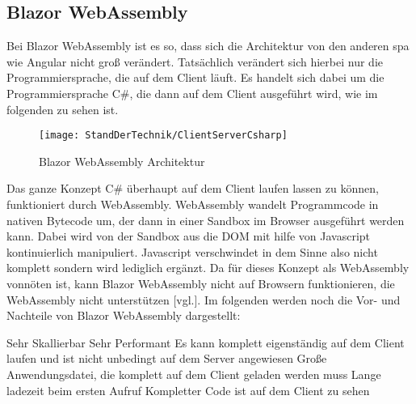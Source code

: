 \subsection{Blazor WebAssembly}
Bei Blazor WebAssembly ist es so, dass sich die Architektur von den anderen \ac{spa} wie Angular
nicht groß verändert. Tatsächlich verändert sich hierbei nur die Programmiersprache, die auf dem
Client läuft. Es handelt sich dabei um die Programmiersprache C\#, die dann auf dem Client
ausgeführt wird, wie im folgenden zu sehen ist.
\begin{figure}[h]
    \centering
    \texttt{[image: StandDerTechnik/ClientServerCsharp]}
    \caption[Blazor WebAssembly Architektur]{Blazor WebAssembly Architektur}
    \label{img:clientservercsharp}
\end{figure}
\newline
\newline
Das ganze Konzept C\# überhaupt auf dem Client laufen lassen zu können, funktioniert durch
WebAssembly. WebAssembly wandelt Programmcode in nativen Bytecode um, der dann in einer Sandbox
im Browser ausgeführt werden kann. Dabei wird von der Sandbox aus die DOM mit hilfe von
Javascript kontinuierlich manipuliert. Javascript verschwindet in dem Sinne also nicht komplett
sondern wird lediglich ergänzt.
Da für dieses Konzept als WebAssembly vonnöten ist, kann Blazor WebAssembly nicht auf Browsern
funktionieren, die WebAssembly nicht unterstützen \cite{HierKommtBlazor}[vgl.].
\newline
\newline
Im folgenden werden noch die Vor- und Nachteile von Blazor WebAssembly dargestellt:
\begin{itemize}
    \pro Sehr Skallierbar
    \pro Sehr Performant
    \pro Es kann komplett eigenständig auf dem Client laufen und ist nicht unbedingt auf dem
    Server angewiesen
    \con Große Anwendungsdatei, die komplett auf dem Client geladen werden muss
    \con Lange ladezeit beim ersten Aufruf
    \con Kompletter Code ist auf dem Client zu sehen
\end{itemize}

